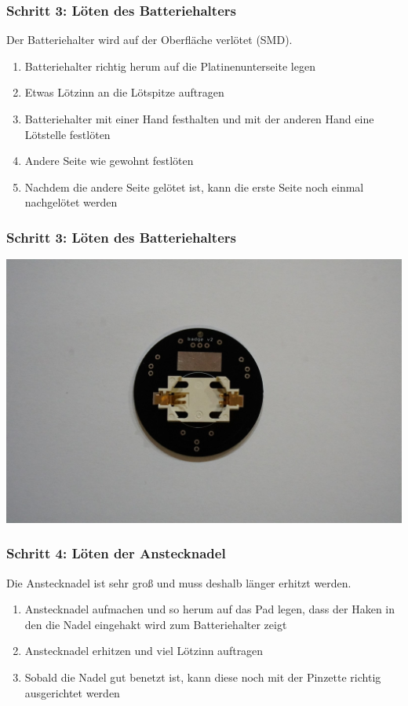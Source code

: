 \documentclass[10pt]{beamer}
\begin{document}
	\begin{frame}
	\frametitle{Schritt 3: Löten des Batteriehalters}
	Der Batteriehalter wird auf der Oberfläche verlötet (SMD).
	\begin{enumerate} 
		\item{Batteriehalter richtig herum auf die Platinenunterseite legen}
		\item{Etwas Lötzinn an die Lötspitze auftragen}
		\item{Batteriehalter mit einer Hand festhalten und mit der anderen Hand eine Lötstelle festlöten}
		\item{Andere Seite wie gewohnt festlöten}
		\item{Nachdem die andere Seite gelötet ist, kann die erste Seite noch einmal nachgelötet werden}
	\end{enumerate}
	\end{frame}

	\begin{frame}
		\frametitle{Schritt 3: Löten des Batteriehalters}
		\includegraphics[width=\linewidth]{images/badge18/battHolderInPlace.JPG}
	\end{frame}

	\begin{frame}
	\frametitle{Schritt 4: Löten der Anstecknadel}
	Die Anstecknadel ist sehr groß und muss deshalb länger erhitzt werden.
	\begin{enumerate} 
		\item{Anstecknadel aufmachen und so herum auf das Pad legen, dass der Haken in den die Nadel eingehakt wird zum Batteriehalter zeigt}
		\item{Anstecknadel erhitzen und viel Lötzinn auftragen}
		\item{Sobald die Nadel gut benetzt ist, kann diese noch mit der Pinzette richtig ausgerichtet werden}
	\end{enumerate}
	\end{frame}
\end{document}
